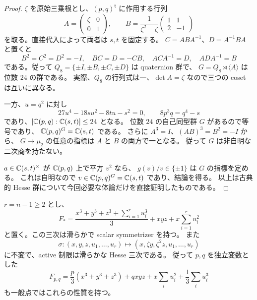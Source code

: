 \begin{proof}
$\zeta$ を原始三乗根とし、$(p,q)^{\mathsf t}$ に作用する行列
\[
 A=\begin{pmatrix}\zeta&0\\0&1\end{pmatrix},\qquad
 B=\frac1{\zeta^2-\zeta}
       \begin{pmatrix}1&1\\2&-1\end{pmatrix}
\]
を取る。直接代入によって両者は $s,t$ を固定する。
$C=ABA^{-1}$、$D=A^{-1}BA$ と置くと
\[
 B^2=C^2=D^2=-I,\quad BC=D=-CB,\quad
 ACA^{-1}=D,\quad ADA^{-1}=B
\]
である。従って
$Q_8=\{\pm I,\pm B,\pm C,\pm D\}$ は quaternion 群で、
$G=Q_8\rtimes\langle A\rangle$ は位数 $24$ の群である。
実際、$Q_8$ の行列式は一、$\det A=\zeta$ なので三つの coset は互いに異なる。

一方、$u=q^2$ に対し
\[
 27u^4-18su^2-8tu-s^2=0,\qquad
 8p^3q=q^4-s
\]
であり、$[\mathbb C(p,q):\mathbb C(s,t)]\le24$ となる。
位数 $24$ の自己同型群 $G$ があるので等号であり、
$\mathbb C(p,q)^G=\mathbb C(s,t)$ である。
さらに $A^3=I$、$(AB)^3=B^2=-I$ から、
$G\to\mu_2$ の任意の指標は $A$ と $B$ の両方で一となる。
従って $G$ は非自明な二次商を持たない。

$a\in\mathbb C(s,t)^\times$ が $\mathbb C(p,q)$ 上で平方 $v^2$ なら、
$g(v)/v\in\{\pm1\}$ は $G$ の指標を定める。
これは自明なので $v\in\mathbb C(p,q)^G=\mathbb C(s,t)$ であり、結論を得る。
以上は古典的 Hesse 群について今回必要な体論だけを直接証明したものである。
\end{proof}

\begin{lemma}[全次元の三捩れ対称な混合例]
\label{lem:nfm-cyclic-scalar-witness}
$r=n-1\ge2$ とし、
\[
 F_*=\frac{x^3+y^3+z^3+\sum_{i=1}^r u_i^3}{3}
             +xyz+x\sum_{i=1}^r u_i^2
\]
と置く。この三次は滑らかで scalar symmetrizer を持つ。
また
\[
 \sigma:(x,y,z,u_1,\ldots,u_r)
       \longmapsto(x,\zeta y,\zeta^2z,u_1,\ldots,u_r)
\]
に不変で、active 制限は滑らかな Hesse 三次である。
従って $p,q$ を独立変数とした
\begin{equation}\label{eq:nfm-cyclic-hesse-test-family}
 F_{p,q}=\frac p3(x^3+y^3+z^3)+qxyz
                +x\sum_i u_i^2+\frac13\sum_i u_i^3
\end{equation}
も一般点ではこれらの性質を持つ。
\end{lemma}

